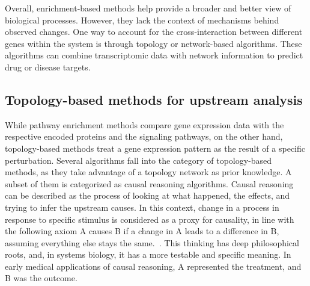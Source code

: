 Overall, enrichment-based methods help provide a broader and better view of biological processes. However, they lack the context of mechanisms behind observed changes. One way to account for the cross-interaction between different genes within the system is through topology or network-based algorithms. These algorithms can combine transcriptomic data with network information to predict drug or disease targets.


\subsection{Topology-based methods for upstream analysis} %
\label{sub:topology_based_methods_for_upstream_analysis}

While pathway enrichment methods compare gene expression data with the respective encoded proteins and the signaling pathways, on the other hand, topology-based methods treat a gene expression pattern as the result of a specific perturbation. Several algorithms fall into the category of topology-based methods, as they take advantage of a topology network as prior knowledge. A subset of them is categorized as causal reasoning algorithms. Causal reasoning can be described as the process of looking at what happened, the effects, and trying to infer the upstream causes. In this context, change in a process in response to specific stimulus is considered as a proxy for causality, in line with the following axiom A causes B if a change in A leads to a difference in B, assuming everything else stays the same.~\cite{RN157}. This thinking has deep philosophical roots, and, in systems biology, it has a more testable and specific meaning. In early medical applications of causal reasoning, A represented the treatment, and B was the outcome. 

